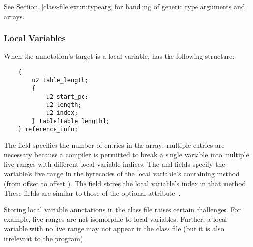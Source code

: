 \documentclass[10pt]{article}
\begin{document}
See Section~\ref{class-file:ext:ri:typearg}
for handling of generic
type arguments and arrays.



\subsubsection{Local Variables\label{class-file:ext:ri:localvar}}

When the annotation's target is a local variable,
 has the following structure:

\begin{Verbatim}
    {
        u2 table_length;
        {
            u2 start_pc;
            u2 length;
            u2 index;
        } table[table_length];
    } reference_info;
\end{Verbatim}

The  field specifies the number of entries in the
 array; multiple entries are necessary because a compiler is
permitted to break a single variable into multiple live ranges with different
local variable indices.
The  and  fields specify the variable's
live range in the bytecodes of the local variable's containing method
(from offset  to offset ).  The
 field stores the local variable's index in that method.
These fields are similar to those of the optional
 attribute~\cite[\S 4.8.12]{LindholmY99:CFF5}.

Storing local variable annotations in the class file raises certain
challenges.  For example, live ranges are not isomorphic to local
variables.  Further, a local variable with no live range may not appear in
the class file (but it is also irrelevant to the program).
\end{document}
